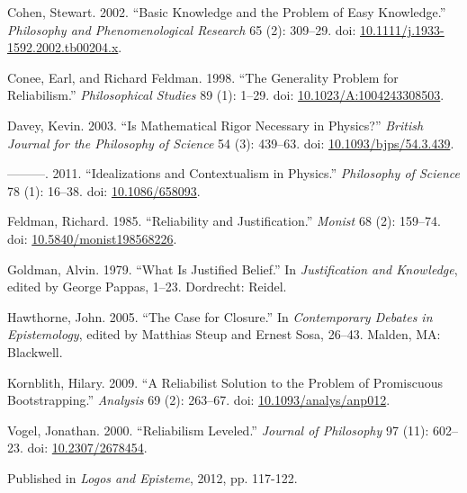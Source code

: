 \documentclass[
  11pt,
  letterpaper,
  DIV=11,
  numbers=noendperiod,
  twoside]{scrartcl}
\newlength{\cslhangindent}
\newenvironment{CSLReferences}[2] %
 {\begin{list}{}{%
  \setlength{\itemindent}{0pt}
  \setlength{\leftmargin}{0pt}
  \setlength{\parsep}{0pt}
  \ifodd #1
   \setlength{\leftmargin}{\cslhangindent}
   \setlength{\itemindent}{-1\cslhangindent}
  \fi
  \setlength{\itemsep}{#2\baselineskip}}}
 {\end{list}}
\begin{document}
\label{refs}
\begin{CSLReferences}{1}{0}
Cohen, Stewart. 2002. {``Basic Knowledge and the Problem of Easy
Knowledge.''} \emph{Philosophy and Phenomenological Research} 65 (2):
309--29. doi:
\href{https://doi.org/10.1111/j.1933-1592.2002.tb00204.x}{10.1111/j.1933-1592.2002.tb00204.x}.

Conee, Earl, and Richard Feldman. 1998. {``The Generality Problem for
Reliabilism.''} \emph{Philosophical Studies} 89 (1): 1--29. doi:
\href{https://doi.org/10.1023/A:1004243308503}{10.1023/A:1004243308503}.

Davey, Kevin. 2003. {``Is Mathematical Rigor Necessary in Physics?''}
\emph{British Journal for the Philosophy of Science} 54 (3): 439--63.
doi:
\href{https://doi.org/10.1093/bjps/54.3.439}{10.1093/bjps/54.3.439}.

---------. 2011. {``Idealizations and Contextualism in Physics.''}
\emph{Philosophy of Science} 78 (1): 16--38. doi:
\href{https://doi.org/10.1086/658093}{10.1086/658093}.

Feldman, Richard. 1985. {``Reliability and Justification.''}
\emph{Monist} 68 (2): 159--74. doi:
\href{https://doi.org/10.5840/monist198568226}{10.5840/monist198568226}.

Goldman, Alvin. 1979. {``What Is Justified Belief.''} In
\emph{Justification and Knowledge}, edited by George Pappas, 1--23.
Dordrecht: Reidel.

Hawthorne, John. 2005. {``The Case for Closure.''} In \emph{Contemporary
Debates in Epistemology}, edited by Matthias Steup and Ernest Sosa,
26--43. Malden, MA: Blackwell.

Kornblith, Hilary. 2009. {``A Reliabilist Solution to the Problem of
Promiscuous Bootstrapping.''} \emph{Analysis} 69 (2): 263--67. doi:
\href{https://doi.org/10.1093/analys/anp012}{10.1093/analys/anp012}.

Vogel, Jonathan. 2000. {``Reliabilism Leveled.''} \emph{Journal of
Philosophy} 97 (11): 602--23. doi:
\href{https://doi.org/10.2307/2678454}{10.2307/2678454}.

\end{CSLReferences}



\noindent Published in\emph{
Logos and Episteme}, 2012, pp. 117-122.
\end{document}
